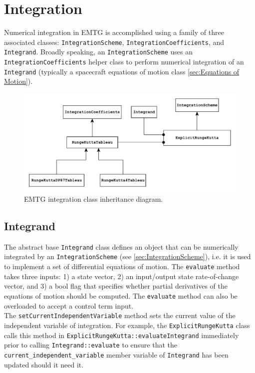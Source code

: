 \chapter{Integration}
\label{chap:integration}

Numerical integration in EMTG is accomplished using a family of three associated classes: \texttt{IntegrationScheme}, \texttt{IntegrationCoefficients}, and \texttt{Integrand}. Broadly speaking, an \texttt{IntegrationScheme} uses an \texttt{IntegrationCoefficients} helper class to perform numerical integration of an \texttt{Integrand} (typically a spacecraft equations of motion class \ref{sec:Equations of Motion}).

\begin{figure}[h!]
    \centering
    \includegraphics[width=1.0\linewidth]{./integration/IntegrationInheritance.pdf}
    \caption{\label{fig:IntegrationInhseritance} EMTG integration class inheritance diagram.}
\end{figure}

\section{Integrand}
\label{sec:Integrand}
The abstract base \texttt{Integrand} class defines an object that can be numerically integrated by an \texttt{IntegrationScheme} (see \ref{sec:IntegrationScheme}), i.e. it is used to implement a set of differential equations of motion. The \texttt{evaluate} method takes three inputs: 1) a state vector, 2) an input/output state rate-of-change vector, and 3) a bool flag that specifies whether partial derivatives of the equations of motion should be computed. The \texttt{evaluate} method can also be overloaded to accept a control term input. \\

The \texttt{setCurrentIndependentVariable} method sets the current value of the independent variable of integration. For example, the \texttt{ExplicitRungeKutta} class calls this method in \texttt{ExplicitRungeKutta::evaluateIntegrand} immediately prior to calling \texttt{Integrand::evaluate} to ensure that the \texttt{current\_independent\_variable} member variable of \texttt{Integrand} has been updated should it need it. \\

